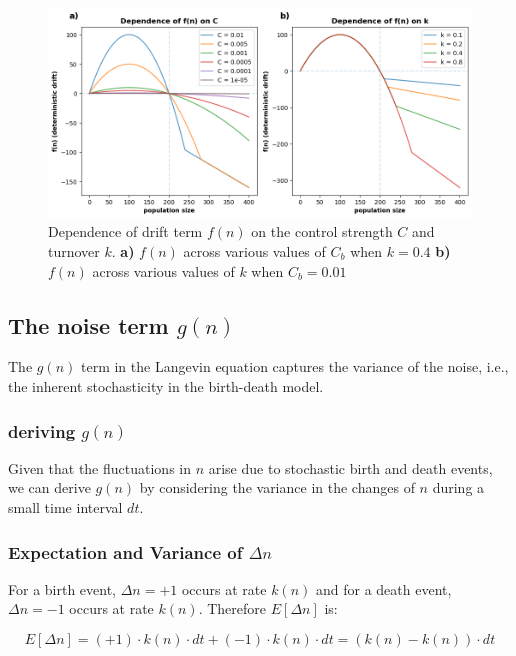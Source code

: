 \documentclass[]{article}
\begin{document}
\begin{figure} [h] 
	\centering %
	\includegraphics[scale=0.65]{figs/drift_dependence} 
	\caption{
		Dependence of drift term $f(n)$ on the control strength $C$ and turnover $k$.
		\textbf{a)} $f(n)$ across various values of $C_b$ when $k = 0.4$
		\textbf{b)} $f(n)$ across various values of $k$ when $C_b = 0.01$
	} 
	\label{fig:drift_depend}
\end{figure}

\subsection{The noise term $g(n)$}

The \( g(n) \) term in the Langevin equation captures the variance of the noise, i.e., the inherent stochasticity in the birth-death model. 

\subsubsection{deriving $g(n)$}

Given that the fluctuations in \( n \) arise due to stochastic birth and death events, we can derive \( g(n) \) by considering the variance in the changes of \( n \) during a small time interval \( dt \).

\subsubsection*{Expectation and Variance of \( \Delta n \)}

For a birth event, \( \Delta n = +1 \) occurs at rate \( k(n) \) and for a death event, \( \Delta n = -1 \) occurs at rate \( k(n) \). Therefore $E[\Delta n]$ is:

\begin{equation}
	E[\Delta n] = (+1) \cdot k(n) \cdot dt + (-1) \cdot k(n) \cdot dt = (k(n) - k(n)) \cdot dt
\end{equation}
\end{document}
